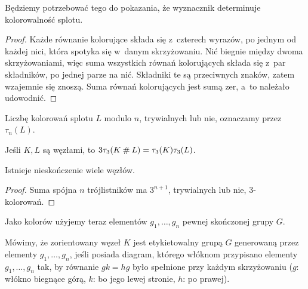 Będziemy potrzebować tego do pokazania, że wyznacznik determinuje kolorowalność splotu.

\begin{proof}
    Każde równanie kolorujące składa się z~czterech wyrazów, po jednym od każdej nici, która spotyka się w~danym skrzyżowaniu.
    Nić biegnie między dwoma skrzyżowaniami, więc suma wszystkich równań kolorujących składa się z~par składników, po jednej parze na nić.
    Składniki te są przeciwnych znaków, zatem wzajemnie się znoszą.
    Suma równań kolorujących jest sumą zer, a~to należało udowodnić.
\end{proof}

Liczbę kolorowań splotu $L$ modulo $n$, trywialnych lub nie, oznaczamy przez $\tau_n(L)$.

\begin{proposition}
    Jeśli $K, L$ są węzłami, to $3\tau_3(K \mathbin{\#} L) = \tau_3(K)\tau_3(L)$.
\end{proposition}

\begin{corollary}
    Istnieje nieskończenie wiele węzłów.
\end{corollary}

\begin{proof}
    Suma spójna $n$ trójlistników ma $3^{n+1}$, trywialnych lub nie, $3$-kolorowań.
\end{proof}

Jako kolorów użyjemy teraz elementów $g_1, \ldots, g_n$ pewnej skończonej grupy $G$.

\begin{definition}[etykietowanie]
    Mówimy, że zorientowany węzeł $K$ jest etykietowalny grupą $G$ generowaną przez elementy $g_1, \ldots, g_n$, jeśli posiada diagram, którego włóknom przypisano elementy $g_1, \ldots, g_n$ tak, by równanie $gk=hg$ było spełnione przy każdym skrzyżowaniu ($g$: włókno biegnące górą, $k$: bo jego lewej stronie, $h$: po prawej).
\begin{comment}
    \[
        \begin{tikzpicture}[baseline=-0.65ex, scale=0.12]
            \useasboundingbox (-5, -5) rectangle (5,5);
            \begin{knot}[clip width=5, end tolerance=1pt, flip crossing/.list={1}]
                \strand[semithick] (-5,5) to (5,-5);
                \strand[semithick, -Latex] (-5,-5) to (5,5);
                \node[darkblue] at (5, 5)[below right] {$g$};
                \node[darkblue] at (5, -5)[above right] {$h$};
                \node[darkblue] at (-5, 5)[below left] {$k$};
            \end{knot}
        \end{tikzpicture}
    \]
\end{comment}
\end{definition}

